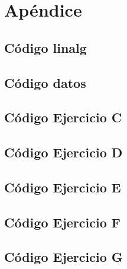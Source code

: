 \section{Apéndice}

\subsection{Código linalg}
\label{code:linalg}




\subsection{Código datos}
\label{code:datos}



\subsection{Código Ejercicio C}
\label{code:ex3}



\subsection{Código Ejercicio D}
\label{code:ex4}



\subsection{Código Ejercicio E}
\label{code:ex5}



\subsection{Código Ejercicio F}
\label{code:ex6}



\subsection{Código Ejercicio G}
\label{code:ex7}

